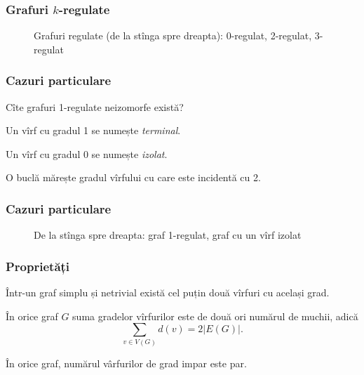 \begin{frame}
  \frametitle{Grafuri $k$-regulate}

\begin{figure}
\centering%
\caption{Grafuri regulate (de la stînga spre dreapta): 0-regulat, 2-regulat, 3-regulat}
\end{figure}

\end{frame}

\begin{frame}
  \frametitle{Cazuri particulare}

Cîte grafuri 1-regulate neizomorfe există?

Un vîrf cu gradul 1 se numește \emph{terminal}.

Un vîrf cu gradul 0 se numește \emph{izolat}.

O buclă mărește gradul vîrfului cu care este incidentă cu 2.

\end{frame}

\begin{frame}
  \frametitle{Cazuri particulare}

\begin{figure}
\centering%
\caption{De la stînga spre dreapta: graf 1-regulat, graf cu un vîrf izolat}
\end{figure}

\end{frame}

\begin{frame}
  \frametitle{Proprietăți}

\begin{theorem}
Într-un graf simplu și netrivial există cel puțin două vîrfuri cu același grad. 
\end{theorem}

\begin{theorem}
În orice graf $G$ suma gradelor vîrfurilor este de două ori numărul de muchii, adică 
\begin{equation}
 \sum_{v\in V(G)}d(v)=2|E(G)|.
\end{equation}
\end{theorem}

\begin{corollary}
În orice graf, numărul vârfurilor de grad impar este par.
\end{corollary}
\end{frame}

